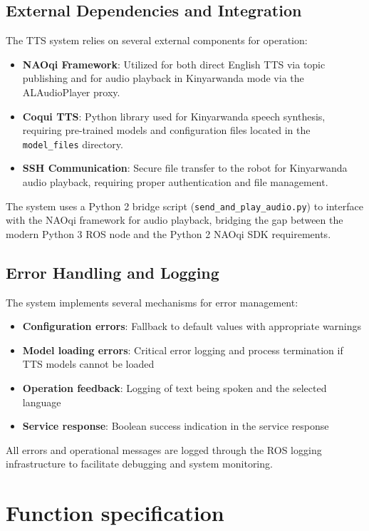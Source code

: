 \documentclass{CSSRforAfrica}
\begin{document}
\subsection{External Dependencies and Integration}
The TTS system relies on several external components for operation:

\begin{itemize}
    \item \textbf{NAOqi Framework}: Utilized for both direct English TTS via topic publishing and for audio playback in Kinyarwanda mode via the ALAudioPlayer proxy.
    \item \textbf{Coqui TTS}: Python library used for Kinyarwanda speech synthesis, requiring pre-trained models and configuration files located in the \texttt{model\_files} directory.
    \item \textbf{SSH Communication}: Secure file transfer to the robot for Kinyarwanda audio playback, requiring proper authentication and file management.
\end{itemize}

The system uses a Python 2 bridge script (\texttt{send\_and\_play\_audio.py}) to interface with the NAOqi framework for audio playback, bridging the gap between the modern Python 3 ROS node and the Python 2 NAOqi SDK requirements.

\subsection{Error Handling and Logging}
The system implements several mechanisms for error management:

\begin{itemize}
    \item \textbf{Configuration errors}: Fallback to default values with appropriate warnings
    \item \textbf{Model loading errors}: Critical error logging and process termination if TTS models cannot be loaded
    \item \textbf{Operation feedback}: Logging of text being spoken and the selected language
    \item \textbf{Service response}: Boolean success indication in the service response
\end{itemize}

All errors and operational messages are logged through the ROS logging infrastructure to facilitate debugging and system monitoring.


\newpage
\section{Function specification}
\end{document}
